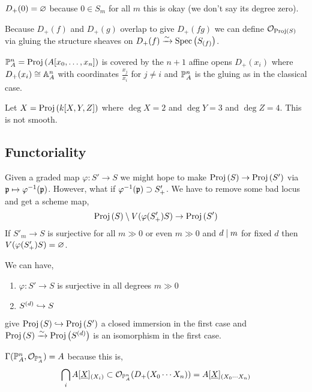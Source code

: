 \documentclass[12pt]{article}
\begin{document}
\begin{rmk}
$D_+(0) = \empty$ because $0 \in S_m$ for all $m$ this is okay (we don't say its degree zero).
\end{rmk}

\begin{prop}
Because $D_+(f)$ and $D_+(g)$ overlap to give $D_+(fg)$ we can define $\struct{\Proj{S}}$ via gluing the structure sheaves on $D_+(f) \iso \Spec{S_{(f)}}$.
\end{prop}

\begin{example}
$\P^n_A = \Proj{A[x_0, \dots, x_n]}$ is covered by the $n+1$ affine opens $D_+(x_i)$ where $D_+(x_i) \cong \A^n_A$ with coordinates $\frac{x_j}{x_i}$ for $j \neq i$ and $\P^n_A$ is the gluing as in the classical case.
\end{example}

\begin{example}
Let $X = \Proj{k[X,Y,Z]}$ where $\deg{X} = 2$ and $\deg{Y} = 3$ and $\deg{Z} = 4$. This is not smooth.
\end{example}

\subsection{Functoriality}

Given a graded map $\varphi : S' \to S$ we might hope to make $\Proj{S} \to \Proj{S'}$ via $\p \mapsto \varphi^{-1}(\p)$. However, what if $\varphi^{-1}(\p) \supset S'_+$. We have to remove some bad locus and get a scheme map,
\[ \Proj{S} \setminus V(\varphi(S'_+) S) \to \Proj{S'} \]
If $S'_m \to S$ is surjective for all $m \gg 0$ or even $m \gg 0$ and $d \divides m$ for fixed $d$ then $V(\varphi(S'_+)S) = \empty$.

\begin{example}
We can have,
\begin{enumerate}
\item $\varphi : S' \to S$ is surjective in all degrees $m \gg 0$
\item $S^{(d)} \embed S$
\end{enumerate}
give $\Proj{S} \embed \Proj{S'}$ a closed immersion in the first case and $\Proj{S} \iso \Proj{S^{(d)}}$ is an isomorphism in the first case.
\end{example}


\begin{example}
$\Gamma(\P^n_A, \struct{\P^n_A}) = A$ because this is,
\[ \bigcap_i A[\underline{X}]_{(X_i)} \subset \struct{\P^n_A}(D_+(X_0 \cdots X_n)) = A[\underline{X}]_{(X_0 \cdots X_n)} \]
\end{example}
\end{document}
